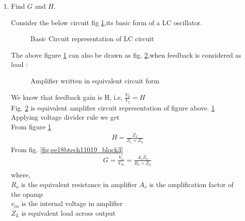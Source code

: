 \begin{enumerate}[label=\thesection.\arabic*.,ref=\thesection.\theenumi]
\solution Condition for sustained oscillation is given by\\
\begin{align}
    GH = 1
\end{align}
Along with, total phase gain o the circuit should be 0 or 2$\pi$\\
\textbf{Justification:} as, when $ GH =1 $, gain becomes infinity, and theoretically we can get output, without actually providing input\\
Total phase gain should be so, as we want our signal to be in phase after every loop traversal.\\


\item Find $G$ and $H$.

\solution Consider the below circuit fig \ref{fig:ee18btech11019_block2},its basic form of a LC oscillator.\\
\begin{figure}[!ht]
    \begin{center}
		\resizebox{\columnwidth}{!}{}
		
	\end{center}
\caption{Basic Circuit representation of LC circuit}
\label{fig:ee18btech11019_block2}
\end{figure}
The above figure \ref{fig:ee18btech11019_block2} can also be drawn as fig. \ref{fig:ee18btech11019_block3},when feedback is considered as load :\\
\begin{figure}[!ht]
    \begin{center}
		\resizebox{\columnwidth}{!}{}
		
	\end{center}
\caption{Amplifier written in equivalent circuit form}
\label{fig:ee18btech11019_block3}
\end{figure}

We know that feedback gain is H, i.e, $\frac{V_0}{V_f} = H$\\
\newline
Fig. \ref{fig:ee18btech11019_block3} is equivalent amplifier circuit representation of figure above. \ref{fig:ee18btech11019_block2}\\
\newline
Applying voltage divider rule we get\\
From figure \ref{fig:ee18btech11019_block2}
\begin{align}
    H = \frac{Z_1}{Z_1 + Z_3}
\end{align}
From fig. \eqref{fig:ee18btech11019_block3}
\begin{align}
    G = \frac{V_o}{V_{in}} = \frac{A_vZ_L}{R_o + Z_L}\\
\end{align}    
    where,\\
    $R_o$ is the equivalent resistance in amplifier
    $A_v$ is the amplification factor of the opamp\\
    $v_{in}$ is the internal voltage in amplifier\\
    $Z_L$ is equivalent load across output
         

\end{enumerate}
